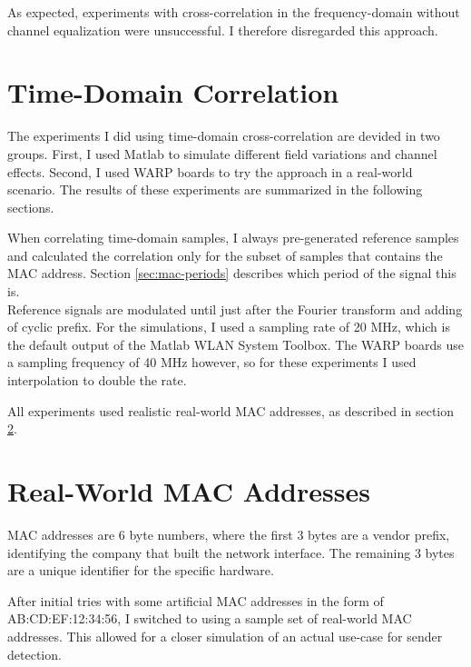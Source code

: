 As expected, experiments with cross-correlation in the frequency-domain without channel equalization were unsuccessful. I therefore disregarded this approach.



\section{Time-Domain Correlation}

The experiments I did using time-domain cross-correlation are devided in two groups. First, I used Matlab to simulate different field variations and channel effects. Second, I used WARP boards to try the approach in a real-world scenario. The results of these experiments are summarized in the following sections.

When correlating time-domain samples, I always pre-generated reference samples and calculated the correlation only for the subset of samples that contains the MAC address. Section \ref{sec:mac-periods} describes which period of the signal this is.\\

Reference signals are modulated until just after the Fourier transform and adding of cyclic prefix. For the simulations, I used a sampling rate of 20 MHz, which is the default output of the Matlab WLAN System Toolbox. The WARP boards use a sampling frequency of 40 MHz however, so for these experiments I used interpolation to double the rate.

All experiments used realistic real-world MAC addresses, as described in section \ref{sec:real-world-macs}.



\section{Real-World MAC Addresses}\label{sec:real-world-macs}

MAC addresses are 6 byte numbers, where the first 3 bytes are a vendor prefix, identifying the company that built the network interface. The remaining 3 bytes are a unique identifier for the specific hardware.

After initial tries with some artificial MAC addresses in the form of AB:CD:EF:12:34:56, I switched to using a sample set of real-world MAC addresses. This allowed for a closer simulation of an actual use-case for sender detection.\\

